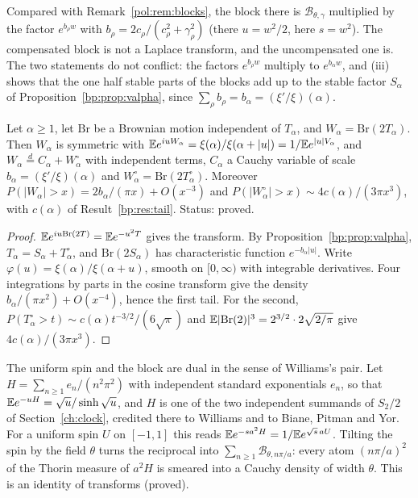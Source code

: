 Compared with Remark~\ref{pol:rem:blocks}, the block there is $\mathcal B_{\theta,\gamma}$ multiplied by the factor $e^{b_\rho w}$ with $b_\rho=2c_\rho/(c_\rho^2+\gamma_\rho^2)$ (there $u=w^2/2$, here $s=w^2$). The compensated block is not a Laplace transform, and the uncompensated one is. The two statements do not conflict: the factors $e^{b_\rho w}$ multiply to $e^{b_\alpha w}$, and (iii) shows that the one half stable parts of the blocks add up to the stable factor $S_\alpha$ of Proposition~\ref{bp:prop:valpha}, since $\sum_\rho b_\rho=b_\alpha=(\xi'/\xi)(\alpha)$.

\begin{proposition}\label{fm:prop:wcauchy}
Let $\alpha\ge1$, let $\mathrm{Br}$ be a Brownian motion independent of $T_\alpha$, and $W_\alpha=\mathrm{Br}(2T_\alpha)$. Then $W_\alpha$ is symmetric with $\mathbb{E} e^{iuW_\alpha}=\xi(\alpha)/\xi(\alpha+|u|)=1/\mathbb{E} e^{|u|V_\alpha}$, and $W_\alpha\overset d=C_\alpha+W_\alpha^\circ$ with independent terms, $C_\alpha$ a Cauchy variable of scale $b_\alpha=(\xi'/\xi)(\alpha)$ and $W_\alpha^\circ=\mathrm{Br}(2T_\alpha^\circ)$. Moreover $P(|W_\alpha|>x)=2b_\alpha/(\pi x)+O(x^{-3})$ and $P(|W_\alpha^\circ|>x)\sim4c(\alpha)/(3\pi x^3)$, with $c(\alpha)$ of Result~\ref{bp:res:tail}. Status: proved.
\end{proposition}

\begin{proof}
$\mathbb{E} e^{iu\mathrm{Br}(2T)}=\mathbb{E} e^{-u^2T}$ gives the transform. By Proposition~\ref{bp:prop:valpha}, $T_\alpha=S_\alpha+T_\alpha^\circ$, and $\mathrm{Br}(2S_\alpha)$ has characteristic function $e^{-b_\alpha|u|}$. Write $\varphi(u)=\xi(\alpha)/\xi(\alpha+u)$, smooth on $[0,\infty)$ with integrable derivatives. Four integrations by parts in the cosine transform give the density $b_\alpha/(\pi x^2)+O(x^{-4})$, hence the first tail. For the second, $P(T_\alpha^\circ>t)\sim c(\alpha)t^{-3/2}/(6\sqrt\pi)$ and $\mathbb{E}|\mathrm{Br}(2)|^3=2^{3/2}\cdot2\sqrt{2/\pi}$ give $4c(\alpha)/(3\pi x^3)$.
\end{proof}

The uniform spin and the block are dual in the sense of Williams's pair. Let $H=\sum_{n\ge1}e_n/(n^2\pi^2)$ with independent standard exponentials $e_n$, so that $\mathbb{E} e^{-uH}=\sqrt u/\sinh\sqrt u$, and $H$ is one of the two independent summands of $S_2/2$ of Section~\ref{ch:clock}, credited there to Williams and to Biane, Pitman and Yor. For a uniform spin $U$ on $[-1,1]$ this reads $\mathbb{E} e^{-sa^2H}=1/\mathbb{E} e^{\sqrt s\,aU}$. Tilting the spin by the field $\theta$ turns the reciprocal into $\sum_{n\ge1}\mathcal B_{\theta,n\pi/a}$: every atom $(n\pi/a)^2$ of the Thorin measure of $a^2H$ is smeared into a Cauchy density of width $\theta$. This is an identity of transforms (proved).

